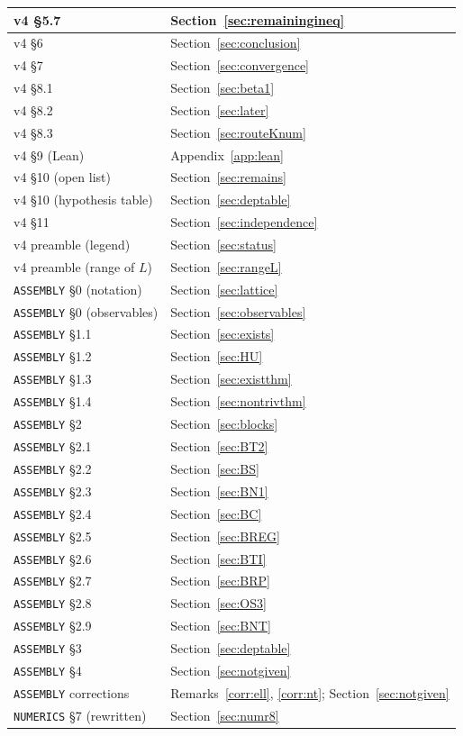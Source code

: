\begin{longtable}{|p{6cm}|p{6cm}|}
v4 \S5.7 & Section~\ref{sec:remainingineq} \\ \hline
v4 \S6 & Section~\ref{sec:conclusion} \\ \hline
v4 \S7 & Section~\ref{sec:convergence} \\ \hline
v4 \S8.1 & Section~\ref{sec:beta1} \\ \hline
v4 \S8.2 & Section~\ref{sec:later} \\ \hline
v4 \S8.3 & Section~\ref{sec:routeKnum} \\ \hline
v4 \S9 (Lean) & Appendix~\ref{app:lean} \\ \hline
v4 \S10 (open list) & Section~\ref{sec:remains} \\ \hline
v4 \S10 (hypothesis table) & Section~\ref{sec:deptable} \\ \hline
v4 \S11 & Section~\ref{sec:independence} \\ \hline
v4 preamble (legend) & Section~\ref{sec:status} \\ \hline
v4 preamble (range of $L$) & Section~\ref{sec:rangeL} \\ \hline
\texttt{ASSEMBLY} \S0 (notation) & Section~\ref{sec:lattice} \\ \hline
\texttt{ASSEMBLY} \S0 (observables) & Section~\ref{sec:observables} \\ \hline
\texttt{ASSEMBLY} \S1.1 & Section~\ref{sec:exists} \\ \hline
\texttt{ASSEMBLY} \S1.2 & Section~\ref{sec:HU} \\ \hline
\texttt{ASSEMBLY} \S1.3 & Section~\ref{sec:existthm} \\ \hline
\texttt{ASSEMBLY} \S1.4 & Section~\ref{sec:nontrivthm} \\ \hline
\texttt{ASSEMBLY} \S2 & Section~\ref{sec:blocks} \\ \hline
\texttt{ASSEMBLY} \S2.1 & Section~\ref{sec:BT2} \\ \hline
\texttt{ASSEMBLY} \S2.2 & Section~\ref{sec:BS} \\ \hline
\texttt{ASSEMBLY} \S2.3 & Section~\ref{sec:BN1} \\ \hline
\texttt{ASSEMBLY} \S2.4 & Section~\ref{sec:BC} \\ \hline
\texttt{ASSEMBLY} \S2.5 & Section~\ref{sec:BREG} \\ \hline
\texttt{ASSEMBLY} \S2.6 & Section~\ref{sec:BTI} \\ \hline
\texttt{ASSEMBLY} \S2.7 & Section~\ref{sec:BRP} \\ \hline
\texttt{ASSEMBLY} \S2.8 & Section~\ref{sec:OS3} \\ \hline
\texttt{ASSEMBLY} \S2.9 & Section~\ref{sec:BNT} \\ \hline
\texttt{ASSEMBLY} \S3 & Section~\ref{sec:deptable} \\ \hline
\texttt{ASSEMBLY} \S4 & Section~\ref{sec:notgiven} \\ \hline
\texttt{ASSEMBLY} corrections & Remarks~\ref{corr:ell}, \ref{corr:nt}; Section~\ref{sec:notgiven} \\ \hline
\texttt{NUMERICS} \S7 (rewritten) & Section~\ref{sec:numr8} \\ \hline
\end{longtable}
\endgroup
